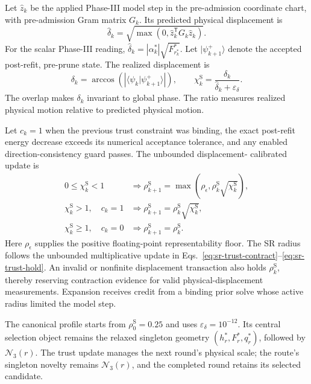 \documentclass[10pt,twocolumn]{article}
\newcommand{\ket}[1]{\lvert #1\rangle}
\begin{document}
Let \(\widehat z_k\) be the applied Phase-III model step in the
pre-admission coordinate chart, with pre-admission Gram matrix \(G_k\). Its
predicted physical displacement is
\begin{equation}
\widehat\delta_k
=\sqrt{\max(0,\widehat z_k^{\mathsf T}G_k\widehat z_k)}.
\label{eq:sr-predicted-displacement}
\end{equation}
For the scalar Phase-III reading,
\(\widehat\delta_k=|\alpha_k^*|\sqrt{F_{r_k^*}^*}\). Let
\(\ket{\psi_{k+1}^{+}}\) denote the accepted post-refit, pre-prune state. The
realized displacement is
\begin{equation}
\delta_k
=\arccos\!\left(
\left|\langle\psi_k|\psi_{k+1}^{+}\rangle\right|
\right),
\qquad
\chi_k^{\mathrm S}
=\frac{\delta_k}{\widehat\delta_k+\varepsilon_\delta}.
\label{eq:sr-displacement-ratio}
\end{equation}
The overlap makes \(\delta_k\) invariant to global phase. The ratio measures
realized physical motion relative to predicted physical motion.

Let \(c_k=1\) when the previous trust constraint was binding, the exact
post-refit energy decrease exceeds its numerical acceptance tolerance, and any
enabled direction-consistency guard passes. The unbounded displacement-
calibrated update is
\begin{align}
0\leq\chi_k^{\mathrm S}<1
&\Longrightarrow
\rho_{k+1}^{\mathrm S}
=\max\!\left(\rho_\epsilon,
\rho_k^{\mathrm S}\sqrt{\chi_k^{\mathrm S}}\right),
\label{eq:sr-trust-contract}\\
\chi_k^{\mathrm S}>1,\quad c_k=1
&\Longrightarrow
\rho_{k+1}^{\mathrm S}
=\rho_k^{\mathrm S}\sqrt{\chi_k^{\mathrm S}},
\label{eq:sr-trust-expand}\\
\chi_k^{\mathrm S}\geq1,\quad c_k=0
&\Longrightarrow
\rho_{k+1}^{\mathrm S}=\rho_k^{\mathrm S}.
\label{eq:sr-trust-hold}
\end{align}
Here \(\rho_\epsilon\) supplies the positive floating-point representability
floor. The SR radius follows the unbounded multiplicative update in
Eqs.~\eqref{eq:sr-trust-contract}--\eqref{eq:sr-trust-hold}. An invalid or
nonfinite displacement transaction also
holds \(\rho_k^{\mathrm S}\), thereby reserving contraction evidence for valid
physical-displacement measurements. Expansion receives credit from a binding
prior solve whose active radius limited the model step.

The canonical profile starts from \(\rho_0^{\mathrm S}=0.25\) and uses
\(\varepsilon_\delta=10^{-12}\). Its central selection object remains the
relaxed singleton geometry \((h_r^*,F_r^*,q_r^*)\), followed by
\(\mathcal N_3(r)\). The trust update manages the next round's physical scale;
the route's singleton novelty remains \(\mathcal N_3(r)\), and the completed
round retains its selected candidate.
\end{document}
